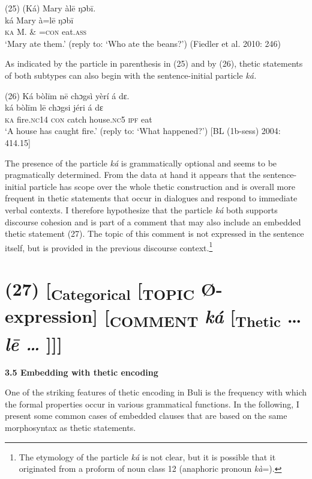 \documentclass[output=paper]{langsci/langscibook}
\begin{document}
\gll \textup{(25)}  (Ká)  Mary  àl\={e}    ŋɔb\={i}.\\
\gll \textup{  ká  Mary  à=l\={e}    ŋɔb\={i}}\\
     \textsc{  }\textsc{ka}  M.  \& =\textsc{con}  eat.\textsc{ass}\\
\glt ‘Mary ate them.’ (reply to: ‘Who ate the beans?’) (Fiedler et al. 2010: 246)
\z

As indicated by the particle in parenthesis in (25) and by (26), thetic statements of both subtypes can also begin with the sentence-initial particle \textit{ká. }

\gll \textup{(26)}  Ká  bòl\={i}m    n\={e}  chɔgsì  yèrí    á  dɛ.\\
\gll \textup{  ká  bòl\={i}m    l\={e}  chɔgsi  jéri    á  dɛ}\\
     \textsc{  ka}  fire.\textsc{nc}14  \textsc{con}  catch   house.\textsc{nc}5   \textsc{ipf}   eat\\
\glt ‘A house has caught fire.’ (reply to: ‘What happened?’) [BL (1b-sess) 2004: 414.15]
\z

The presence of the particle \textit{ká }is grammatically optional and seems to be pragmatically determined. From the data at hand it appears that the sentence-initial particle has scope over the whole thetic construction and is overall more frequent in thetic statements that occur in dialogues and respond to immediate verbal contexts. I therefore hypothesize that the particle \textit{ká }both supports discourse cohesion and is part of a comment that may also include an embedded thetic statement (27). The topic of this comment is not expressed in the sentence itself, but is provided in the previous discourse context.\footnote{   The etymology of the particle \textit{ká }is not clear, but it is possible that it originated from a proform of noun class 12 (anaphoric pronoun \textit{kà}=).} 

\chapter[(27)  [Categorical [TOPIC Ø{}-expression{]} [COMMENT ká [Thetic … le\={ } … {]}{]}{]}]{(27)  [\textbf{\textsubscript{Categorical}}\textsubscript{ }[\textsubscript{TOPIC }Ø-expression]\textsubscript{ }[\textsubscript{COMMENT}\textit{ ká} [\textbf{\textsubscript{Thetic}} … \textit{l\={e} … }]]]}

\textbf{3.5 Embedding with thetic encoding}

One of the striking features of thetic encoding in Buli is the frequency with which the formal properties occur in various grammatical functions. In the following, I present some common cases of embedded clauses that are based on the same morphosyntax as thetic statements.
\end{document}
